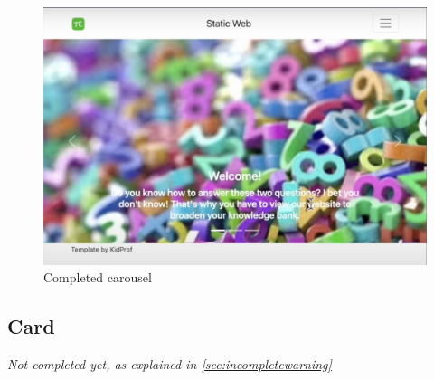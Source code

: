 \begin{figure}[h]
\centering
\includegraphics[width=15cm]{images/chn7-carousel-completed.png}
\caption{Completed carousel}
\end{figure}

\subsection{Card}
\label{sec:cards}

\textit{Not completed yet, as explained in \cref{sec:incompletewarning}}


